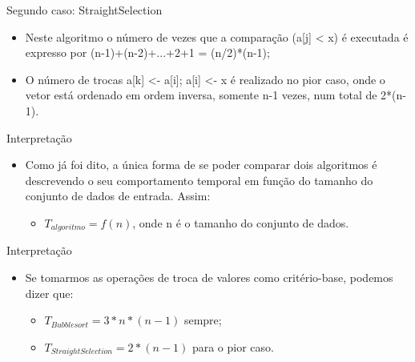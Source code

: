 \documentclass[12pt,table,xcolor={dvipsnames}]{beamer}
\begin{document}
\begin{frame}[fragile]{Segundo caso: StraightSelection}
\begin{itemize}
\item Neste algoritmo o número de vezes que a comparação (a[j] < x) é executada é expresso por (n-1)+(n-2)+...+2+1 = (n/2)*(n-1);
\item O número de trocas a[k] <- a[i]; a[i] <- x é realizado no pior caso, onde o vetor está ordenado em ordem inversa, somente n-1 vezes, num total de 2*(n-1).
\end{itemize}
\end{frame}

\begin{frame}[fragile]{Interpretação}
\begin{itemize}
\item Como já foi dito, a única forma de se poder comparar dois algoritmos é descrevendo o seu comportamento temporal em função do tamanho do conjunto de dados de entrada. Assim:
\begin{itemize}
\item $T_{algoritmo} = f(n)$, onde n é o tamanho do conjunto de dados.
\end{itemize}
\end{itemize}
\end{frame}

\begin{frame}[fragile]{Interpretação}
\begin{itemize}
\item Se tomarmos as operações de troca de valores como critério-base, podemos dizer que:
\begin{itemize}
\item $T_{Bubblesort} = 3*n*(n-1)$ sempre;
\item $T_{StraightSelection }= 2*(n-1)$ para o pior caso.
\end{itemize}
\end{itemize}
\end{frame}
\end{document}
